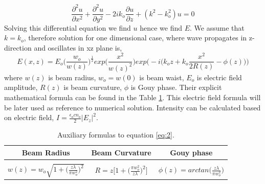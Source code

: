 \documentclass{article}
\begin{document}
	\begin{equation}\label{eq:1}
	\frac{\partial^2 u}{\partial x^2}+ \frac{\partial^2 u}{\partial y^2} - 2ik_o\frac{\partial u}{\partial z}+(k^2-k_o^2)u=0
	\end{equation}
	Solving this differential equation we find $u$ hence we find $E$. We assume that $k = k_o$, therefore solution for one dimensional case, where wave propagates in z-direction and oscillates in xz plane is,
	\begin{equation}\label{eq:2}
	E(x,z)=E_o\bigg(\frac{w_o}{w(z)}\bigg)^{\frac{1}{2}}exp\bigg(\frac{x^2}{w(z)^2}\bigg)exp\bigg(-i\Big(k_oz+k_o\frac{x^2}{2R(z)}-\phi(z)\Big)\bigg)
	\end{equation}
	where $w(z)$ is beam radius, $w_o = w(0)$ is beam waist, $E_o$ is electric field amplitude, $R(z)$ is beam curvature, $\phi$ is Gouy phase. Their explicit mathematical formula can be found in the Table \ref{tab:Table1}. This electric field formula will be later used as reference to numerical solution.
	Intensity can be calculated based on electric field, $I = \frac{\epsilon _o c n_o}{2}|E_z|^2$.
	

	\begin{table}[h!]
		\begin{center}
			\begin{tabular}{c| c| c} %
				\textbf{Beam Radius} & \textbf{Beam Curvature} & \textbf{Gouy phase}\\
				\hline
				&&\\
				$w(z)= w_o\sqrt{1+\Big(\frac{z\lambda}{\pi w_o^2}\Big)^2}$ & $R=z\bigg[1+\Big(\frac{\pi w_o^2}{z\lambda}\Big)^2\bigg]$ & $\phi(z)=arctan\Big(\frac{z\lambda}{\pi w_o^2}\Big)$\\
			\end{tabular}
			\caption{\label{tab:Table1} Auxiliary formulas to equation \ref{eq:2}.}
		\end{center}
	\end{table}
	
\end{document}
